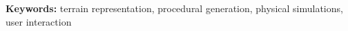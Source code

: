 



\textbf{Keywords:} terrain representation, procedural generation, physical simulations, user interaction


